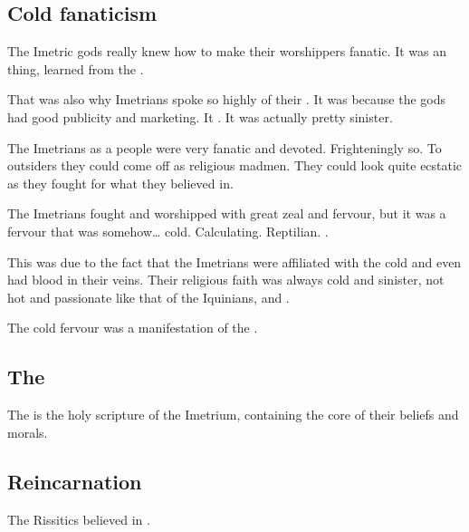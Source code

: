 \subsection{Cold fanaticism}
The Imetric gods really knew how to make their worshippers fanatic. 
It was an  thing, learned from the \nagae. 

That was also why Imetrians spoke so highly of their . 
It was because the gods had good publicity and marketing. 
It . 
It was actually pretty sinister.

The Imetrians as a people were very fanatic and devoted. 
Frighteningly so. 
To outsiders they could come off as religious madmen. 
They could look quite ecstatic as they fought for what they believed in. 

The Imetrians fought and worshipped with great zeal and fervour, but it was a fervour that was somehow\ldots{} cold. 
Calculating. 
Reptilian. 
\Ophidian. 

This was due to the fact that the Imetrians were affiliated with the cold \nagae{} and even had \naga{} blood in their veins. 
Their religious faith was always cold and sinister, not hot and passionate like that of the Iquinians, \Ortaicans{} and \Tepharites. 

The cold fervour was a manifestation of the . 







\subsection{The \Imetriad}
\index{\Imetriad}
The \Imetriad{} is the holy scripture of the Imetrium, containing the core of their beliefs and morals. 









\subsection{Reincarnation}
The Rissitics believed in . 















